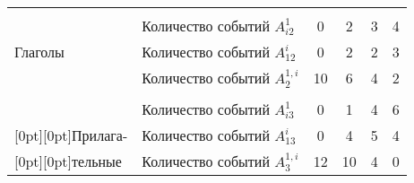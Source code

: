 \begin{table*}
\begin{center}
\begin{tabular}{|l|l|c|c|c|c|}
\hline
&&&&&\\[-9pt]
&Количество событий $A^1_{i2}$&\hphantom{9}0&\hphantom{9}2&\hphantom{9}3&\hphantom{9}4\\
Глаголы&Количество событий  $A^i_{12}$&\hphantom{9}0&\hphantom{9}2&\hphantom{9}2&\hphantom{9}3\\
&Количество событий $A_2^{1,i}$&10&\hphantom{9}6&\hphantom{9}4&\hphantom{9}2\\
\hline
&&&&&\\[-9pt]
&Количество событий $A^1_{i3}$&\hphantom{9}0&\hphantom{9}1&\hphantom{9}4&\hphantom{9}6\\
\multicolumn{1}{|l|}{\raisebox{6pt}[0pt][0pt]{Прилага-}}&Количество событий $A^i_{13}$&\hphantom{9}0&\hphantom{9}4&\hphantom{9}5&\hphantom{9}4\\
\multicolumn{1}{|l|}{\raisebox{6pt}[0pt][0pt]{тельные}}&Количество событий $A_3^{1,i}$&12&10&\hphantom{9}4&\hphantom{9}0\\
\hline
\end{tabular}
\end{center}
\end{table*}

